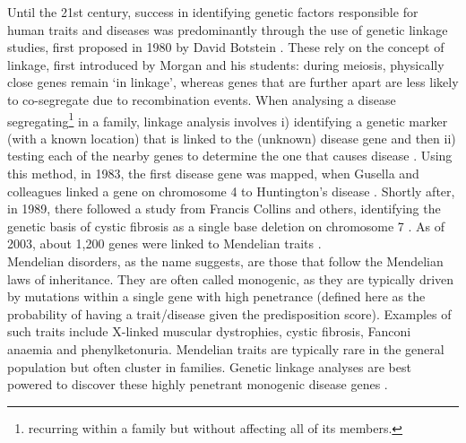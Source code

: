 Until the 21st century, success in identifying genetic factors responsible for human traits and diseases was predominantly 
through the use of genetic linkage studies, first proposed in 1980 by David Botstein \cite{botstein1980construction}.
These rely on the concept of linkage, first introduced by Morgan and his students: during meiosis, physically close genes remain `in linkage', whereas genes that are further apart are less likely to co-segregate due to recombination events.
When analysing a disease segregating\footnote{recurring within a family but without affecting all of its members.} in a family, linkage analysis
involves i) identifying a genetic marker (with a known location) that is linked to the (unknown) disease gene and then ii) testing each of the nearby genes to determine the one that causes disease \cite{teare2005genetic}. 
Using this method, in 1983, the first disease gene was mapped, when Gusella and colleagues linked a gene on chromosome 4 to Huntington's disease \cite{gusella1983polymorphic}.
Shortly after, in 1989, there followed a study from Francis Collins and others, identifying the genetic basis of cystic fibrosis as a single base deletion on chromosome 7 \cite{riordan1989identification}.
As of 2003, about 1,200 genes were linked to Mendelian traits \cite{botstein2003discovering}.\\

Mendelian disorders, as the name suggests, are those that follow the Mendelian laws of inheritance.
They are often called monogenic, as they are typically driven by mutations within a single gene with high penetrance (defined here as the probability of having a trait/disease given the predisposition score). 
Examples of such traits include X-linked muscular dystrophies, cystic fibrosis, Fanconi anaemia and phenylketonuria. 
Mendelian traits are typically rare 
in the general population but often cluster in families.
Genetic linkage analyses are best powered to discover these highly penetrant monogenic disease genes \cite{cardon2001association}.\\

